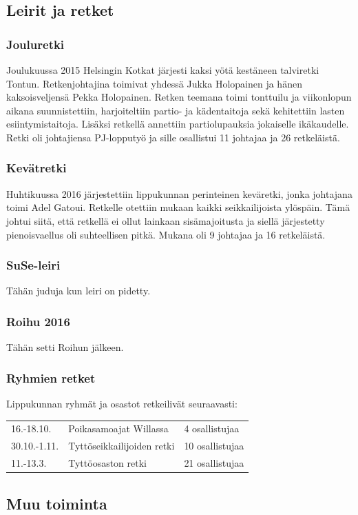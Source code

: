 \documentclass[a4paper, 12pt, finnish]{report} %
\begin{document}
\subsection{Leirit ja retket}
\subsubsection{Jouluretki}
Joulukuussa 2015 Helsingin Kotkat järjesti kaksi yötä kestäneen talviretki Tontun. Retkenjohtajina toimivat yhdessä Jukka Holopainen ja hänen kaksoisveljensä Pekka Holopainen. Retken teemana toimi tonttuilu ja viikonlopun aikana suunnistettiin, harjoiteltiin partio- ja kädentaitoja sekä kehitettiin lasten esiintymistaitoja. Lisäksi retkellä annettiin partiolupauksia jokaiselle ikäkaudelle. Retki oli johtajiensa PJ-lopputyö ja sille osallistui 11 johtajaa ja 26 retkeläistä.
\subsubsection{Kevätretki}
Huhtikuussa 2016 järjestettiin lippukunnan perinteinen keväretki, jonka johtajana toimi Adel Gatoui. Retkelle otettiin mukaan kaikki seikkailijoista ylöspäin. Tämä johtui siitä, että retkellä ei ollut lainkaan sisämajoitusta ja siellä järjestetty pienoisvaellus oli suhteellisen pitkä. Mukana oli 9 johtajaa ja 16 retkeläistä.
\subsubsection{SuSe-leiri}
Tähän juduja kun leiri on pidetty.
\subsubsection{Roihu 2016}
Tähän setti Roihun jälkeen.
\subsubsection{Ryhmien retket}
Lippukunnan ryhmät ja osastot retkeilivät seuraavasti:
\begin{center}
	\begin{tabular}{l l l}
		16.-18.10. & Poikasamoajat Willassa & 4 osallistujaa\\
		30.10.-1.11. & Tyttöseikkailijoiden retki & 10 osallistujaa\\
		11.-13.3. & Tyttöosaston retki & 21 osallistujaa\\
	\end{tabular}
\end{center}
\subsection{Muu toiminta}
\end{document}
